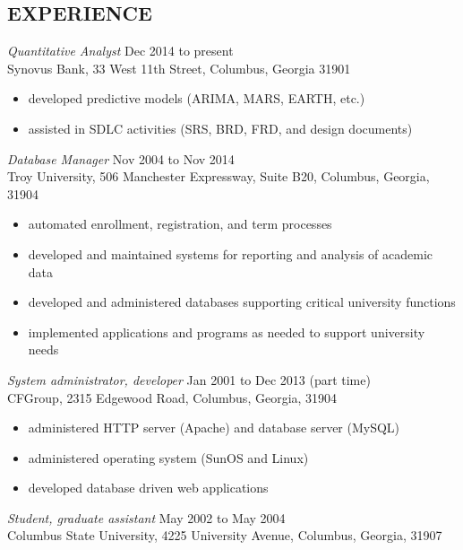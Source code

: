 \documentclass[margin, 11pt]{res} %
\begin{document}
\begin{resume}
\section{EXPERIENCE}

{\it Quantitative Analyst} \hfill Dec 2014 to present \\
Synovus Bank, 33 West 11th Street, Columbus, Georgia 31901

\begin{itemize} \itemsep -2pt %
\item developed predictive models (ARIMA, MARS, EARTH, etc.)
\item assisted in SDLC activities (SRS, BRD, FRD, and design documents)
\end{itemize}
 
{\it Database Manager} \hfill Nov 2004 to Nov 2014 \\
Troy University, 506 Manchester Expressway, Suite B20, Columbus, Georgia, 31904

\begin{itemize} \itemsep -2pt %
\item automated enrollment, registration, and term processes
\item developed and maintained systems for reporting and analysis of academic data
\item developed and administered databases supporting critical university functions 
\item implemented applications and programs as needed to support university needs 
\end{itemize}
 
{\it System administrator, developer} \hfill Jan 2001 to Dec 2013 (part time) \\
CFGroup, 2315 Edgewood Road, Columbus, Georgia, 31904

\begin{itemize} \itemsep -2pt %
\item administered HTTP server (Apache) and database server (MySQL)
\item administered operating system (SunOS and Linux)
\item developed database driven web applications
\end{itemize}
 
{\it Student, graduate assistant} \hfill May 2002 to May 2004 \\
Columbus State University, 4225 University Avenue, Columbus, Georgia, 31907


\end{resume}
\end{document}
